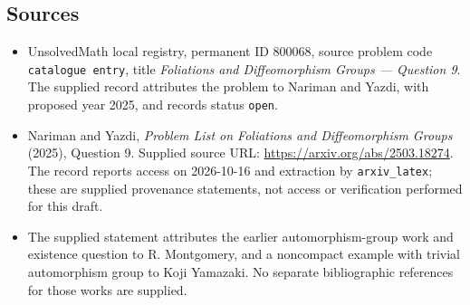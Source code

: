 \documentclass[11pt]{article}
\begin{document}
\subsection{Sources}
\begin{itemize}
\item UnsolvedMath local registry, permanent ID \(800068\), source problem code \texttt{catalogue entry}, title \emph{Foliations and Diffeomorphism Groups --- Question 9}. The supplied record attributes the problem to Nariman and Yazdi, with proposed year 2025, and records status \texttt{open}.
\item Nariman and Yazdi, \emph{Problem List on Foliations and Diffeomorphism Groups} (2025), Question 9. Supplied source URL: \url{https://arxiv.org/abs/2503.18274}. The record reports access on 2026-10-16 and extraction by \texttt{arxiv\_latex}; these are supplied provenance statements, not access or verification performed for this draft.
\item The supplied statement attributes the earlier automorphism-group work and existence question to R. Montgomery, and a noncompact example with trivial automorphism group to Koji Yamazaki. No separate bibliographic references for those works are supplied.
\end{itemize}
\end{document}
